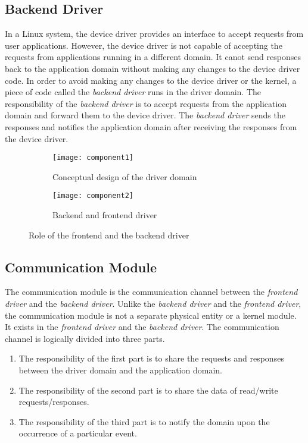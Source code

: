 \subsection{Backend Driver}
\label{subsec:backend}
In a Linux system, the device driver provides an interface to accept requests from user applications. However, the device driver is not capable of accepting the requests from applications running in a different domain. It canot send responses back to the application domain without making any changes to the device driver code. In order to avoid making any changes to the device driver or the kernel, a piece of code called the \textit{backend driver} runs in the driver domain. The responsibility of the \textit{backend driver} is to accept requests from the application domain and forward them to the device driver. The \textit{backend driver} sends the responses and notifies the application domain after receiving the responses from the device driver.
\begin{figure}[!ht]
    \centering
    \begin{subfigure}[b]{0.45\textwidth}
	\texttt{[image: component1]}
	\caption{Conceptual design of the driver domain}
	\label{fig:conept}
    \end{subfigure}
	\hfill
    \begin{subfigure}[b]{0.45\textwidth}
	\texttt{[image: component2]}
	\caption{Backend and frontend driver}
	\label{fig:backendfrontend}
    \end{subfigure}
    \caption{Role of the frontend and the backend driver}\label{fig:fault tolerence}
\end{figure}

\subsection{Communication Module}
\label{sub:communicationmodule}
The communication module is the communication channel between the \textit{frontend driver} and the \textit{backend driver}. Unlike the \textit{backend driver} and the \textit{frontend driver}, the communication module is not a separate physical entity or a kernel module. It exists in the \textit{frontend driver} and the \textit{backend driver}. The communication channel is logically divided into three parts. 
\begin{enumerate} 
\item The responsibility of the first part is to share the requests and responses between the driver domain and the application domain.
\item The responsibility of the second part is to share the data of read/write requests/responses.
\item The responsibility of the third part is to notify the domain upon the occurrence of a particular event. 
\end{enumerate}

